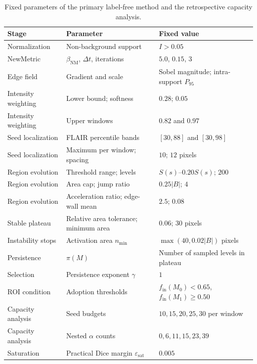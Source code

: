 \documentclass[11pt,a4paper]{article}
\begin{document}
\begin{table}[htbp]\centering
\caption{Fixed parameters of the primary label-free method and the retrospective
capacity analysis.}\label{tab:method-parameters}
\small
\begin{tabular}{lll}
\toprule
Stage & Parameter & Fixed value \\
\midrule
Normalization & Non-background support & $I>0.05$ \\
NewMetric & $\beta_{\mathrm{NM}}$, $\Delta t$, iterations & $5.0$, $0.15$, $3$ \\
Edge field & Gradient and scale & Sobel magnitude; intra-support $P_{95}$ \\
Intensity weighting & Lower bound; softness & $0.28$; $0.05$ \\
Intensity weighting & Upper windows & $0.82$ and $0.97$ \\
Seed localization & FLAIR percentile bands & $[30,88]$ and $[30,98]$ \\
Seed localization & Maximum per window; spacing & $10$; $12$ pixels \\
Region evolution & Threshold range; levels & $S(s)$--$0.20S(s)$; $200$ \\
Region evolution & Area cap; jump ratio & $0.25|B|$; $4$ \\
Region evolution & Acceleration ratio; edge-wall mean & $2.5$; $0.08$ \\
Stable plateau & Relative area tolerance; minimum area & $0.06$; $30$ pixels \\
Instability stops & Activation area $n_{\min}$ & $\max(40,0.02|B|)$ pixels \\
Persistence & $\pi(M)$ & Number of sampled levels in plateau \\
Selection & Persistence exponent $\gamma$ & $1$ \\
ROI condition & Adoption thresholds & $f_{\mathrm{in}}(M_0)<0.65$, $f_{\mathrm{in}}(M_1)\ge0.50$ \\
Capacity analysis & Seed budgets & $10,15,20,25,30$ per window \\
Capacity analysis & Nested $\alpha$ counts & $0,6,11,15,23,39$ \\
Saturation & Practical Dice margin $\varepsilon_{\mathrm{sat}}$ & $0.005$ \\
\bottomrule
\end{tabular}
\end{table}

\iffalse %
\end{document}
